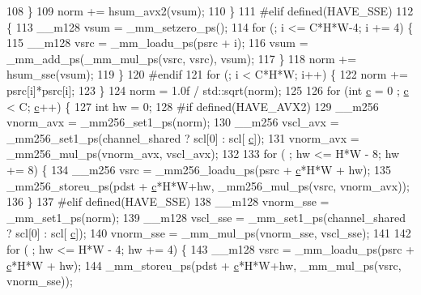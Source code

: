 \begin{DoxyCode}
108                     \}
109                     norm += hsum\_avx2(vsum);
110                 \}
111 \textcolor{preprocessor}{#elif defined(HAVE\_SSE)}
112                 \{
113                     \_\_m128 vsum = \_mm\_setzero\_ps();
114                     \textcolor{keywordflow}{for} (; i <= C*H*W-4; i += 4) \{
115                         \_\_m128 vsrc = \_mm\_loadu\_ps(psrc + i);
116                         vsum = \_mm\_add\_ps(\_mm\_mul\_ps(vsrc, vsrc), vsum);
117                     \}
118                     norm += hsum\_sse(vsum);
119                 \}
120 \textcolor{preprocessor}{#endif}
121                 \textcolor{keywordflow}{for} (; i < C*H*W; i++) \{
122                     norm += psrc[i]*psrc[i];
123                 \}
124                 norm = 1.0f / std::sqrt(norm);
125 
126                 \textcolor{keywordflow}{for} (\textcolor{keywordtype}{int} \hyperlink{CMakeCache_8txt_aac1d6a1710812201527c735f7c6afbaa}{c} = 0 ; \hyperlink{CMakeCache_8txt_aac1d6a1710812201527c735f7c6afbaa}{c} < C; \hyperlink{CMakeCache_8txt_aac1d6a1710812201527c735f7c6afbaa}{c}++) \{
127                     \textcolor{keywordtype}{int} hw = 0;
128 \textcolor{preprocessor}{#if defined(HAVE\_AVX2)}
129                     \_\_m256 vnorm\_avx = \_mm256\_set1\_ps(norm);
130                     \_\_m256 vscl\_avx = \_mm256\_set1\_ps(channel\_shared ? scl[0] : scl[
      \hyperlink{CMakeCache_8txt_aac1d6a1710812201527c735f7c6afbaa}{c}]);
131                     vnorm\_avx = \_mm256\_mul\_ps(vnorm\_avx, vscl\_avx);
132 
133                     \textcolor{keywordflow}{for} ( ; hw <= H*W - 8; hw += 8) \{
134                         \_\_m256 vsrc = \_mm256\_loadu\_ps(psrc + \hyperlink{CMakeCache_8txt_aac1d6a1710812201527c735f7c6afbaa}{c}*H*W + hw);
135                         \_mm256\_storeu\_ps(pdst + \hyperlink{CMakeCache_8txt_aac1d6a1710812201527c735f7c6afbaa}{c}*H*W+hw, \_mm256\_mul\_ps(vsrc, vnorm\_avx));
136                     \}
137 \textcolor{preprocessor}{#elif defined(HAVE\_SSE)}
138                     \_\_m128 vnorm\_sse = \_mm\_set1\_ps(norm);
139                     \_\_m128 vscl\_sse = \_mm\_set1\_ps(channel\_shared ? scl[0] : scl[
      \hyperlink{CMakeCache_8txt_aac1d6a1710812201527c735f7c6afbaa}{c}]);
140                     vnorm\_sse = \_mm\_mul\_ps(vnorm\_sse, vscl\_sse);
141 
142                     \textcolor{keywordflow}{for} ( ; hw <= H*W - 4; hw += 4) \{
143                         \_\_m128 vsrc = \_mm\_loadu\_ps(psrc + \hyperlink{CMakeCache_8txt_aac1d6a1710812201527c735f7c6afbaa}{c}*H*W + hw);
144                         \_mm\_storeu\_ps(pdst + \hyperlink{CMakeCache_8txt_aac1d6a1710812201527c735f7c6afbaa}{c}*H*W+hw, \_mm\_mul\_ps(vsrc, vnorm\_sse));

\end{DoxyCode}
